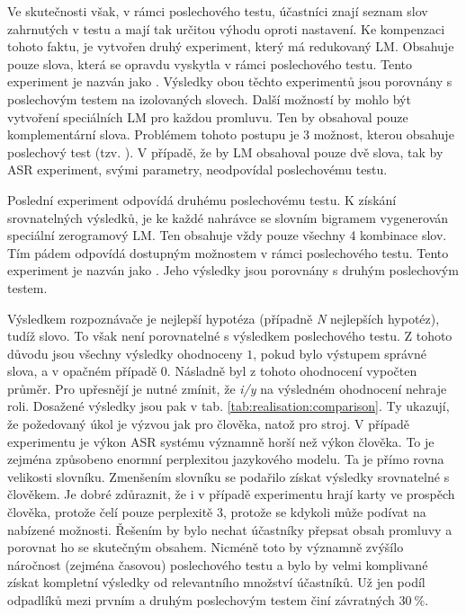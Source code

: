 Ve skutečnosti však, v rámci poslechového testu, účastníci znají seznam slov zahrnutých v testu a mají tak určitou výhodu oproti  nastavení. Ke kompenzaci tohoto faktu, je vytvořen druhý experiment, který má redukovaný LM. Obsahuje pouze slova, která se opravdu vyskytla v rámci poslechového testu. Tento experiment je nazván jako . Výsledky obou těchto experimentů jsou porovnány s poslechovým testem na izolovaných slovech. Další možností by mohlo být vytvoření speciálních LM pro každou promluvu. Ten by obsahoval pouze komplementární slova. Problémem tohoto postupu je 3 možnost, kterou obsahuje poslechový test (tzv. ). V případě, že by LM obsahoval pouze dvě slova, tak by ASR experiment, svými parametry, neodpovídal poslechovému testu.

Poslední experiment odpovídá druhému poslechovému testu. K získání srovnatelných výsledků, je ke každé nahrávce se slovním bigramem vygenerován speciální zerogramový LM. Ten obsahuje vždy pouze všechny 4 kombinace slov. Tím pádem odpovídá dostupným možnostem v rámci poslechového testu. Tento experiment je nazván jako . Jeho výsledky jsou porovnány s druhým poslechovým testem.

Výsledkem rozpoznávače je nejlepší hypotéza (případně \textit{N} nejlepších hypotéz), tudíž slovo. To však není porovnatelné s výsledkem poslechového testu. Z tohoto důvodu jsou všechny výsledky ohodnoceny $1$, pokud bylo výstupem správné slova, a v opačném případě $0$. Násladně byl z tohoto ohodnocení vypočten průměr. Pro upřesnějí je nutné zmínit, že \textit{i/y} na výsledném ohodnocení nehraje roli. Dosažené výsledky jsou pak v tab. \ref{tab:realisation:comparison}. Ty ukazují, že požedovaný úkol je výzvou jak pro člověka, natož pro stroj. V případě experimentu  je výkon ASR systému významně horší než výkon člověka. To je zejména způsobeno enormní perplexitou jazykového modelu. Ta je přímo rovna velikosti slovníku. Zmenšením slovníku se podařilo získat výsledky srovnatelné s člověkem. Je dobré zdůraznit, že i v případě  experimentu hrají karty ve prospěch člověka, protože čelí pouze perplexitě $3$, protože se kdykoli může podívat na nabízené možnosti. Řešením by bylo nechat účastníky přepsat obsah promluvy a porovnat ho se skutečným obsahem. Nicméně toto by významně zvýšílo náročnost (zejména časovou) poslechového testu a bylo by velmi komplivané získat kompletní výsledky od relevantního množství účastníků. Už jen podíl odpadlíků mezi prvním a druhým poslechovým testem činí závratných $30\ \%$.

